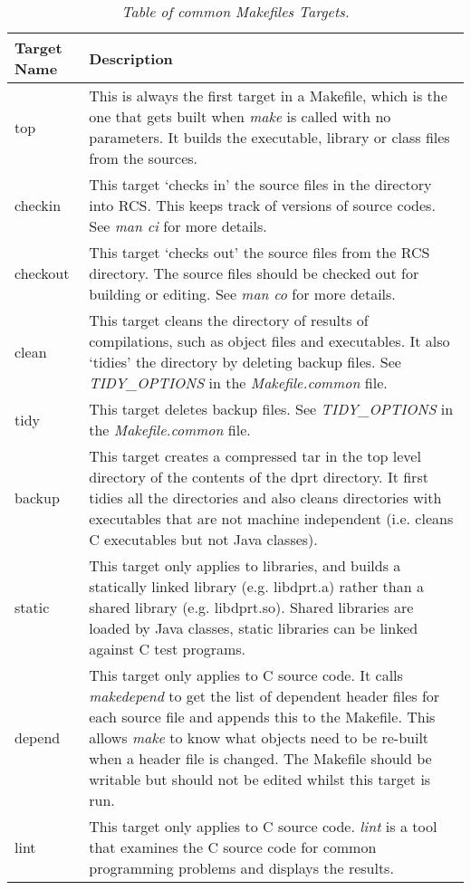 \documentclass[10pt,a4paper]{article}
\begin{document}
\begin{table}[!h]
\begin{center}
\begin{footnotesize}
\begin{tabular}{|l|p{40em}|} \hline
{\bf Target Name} 	& {\bf Description}\\ \hline
top			& This is always the first target in a Makefile, which is the one that gets built 
when {\em make } is called with no parameters. It builds the executable, library or class files from the 
sources.\\ \hline
checkin			& This target `checks in' the source files in the directory into RCS. This keeps
track of versions of source codes. See {\em man ci} for more details.  \\ \hline
checkout		& This target `checks out' the source files from the RCS directory. The source files
should be checked out for building or editing. See {\em man co} for more details. \\ \hline
clean			& This target cleans the directory of results of compilations, such as object files and
executables. It also `tidies' the directory by deleting backup files. 
See {\em TIDY\_OPTIONS} in the {\em Makefile.common} file. \\ \hline
tidy			& This target deletes backup files. See {\em TIDY\_OPTIONS}
in the {\em Makefile.common} file.\\ \hline
backup			& This target creates a compressed tar in the top level directory of the contents of the dprt
directory. It first tidies all the directories and also cleans directories with executables that are not
machine independent (i.e. cleans C executables but not Java classes).\\ \hline
static			& This target only applies to libraries, and builds a statically linked library 
(e.g. libdprt.a) rather than a shared library (e.g. libdprt.so). Shared libraries are loaded by Java
classes, static libraries can be linked against C test programs.\\ \hline
depend			& This target only applies to C source code. It calls {\em makedepend} to get the
list of dependent header files for each source file and appends this to the Makefile. This allows {\em make}
to know what objects need to be re-built when a header file is changed.  The Makefile should be
writable but should not be edited whilst this target is run.\\ \hline
lint			& This target only applies to C source code. {\em lint} is a tool that examines the
C source code for common programming problems and displays the results.\\ \hline
\end{tabular}
\end{footnotesize}
\end{center}
\caption{\em Table of common Makefiles Targets.}
\label{tab:maketarget} 
\end{table}
\end{document}
